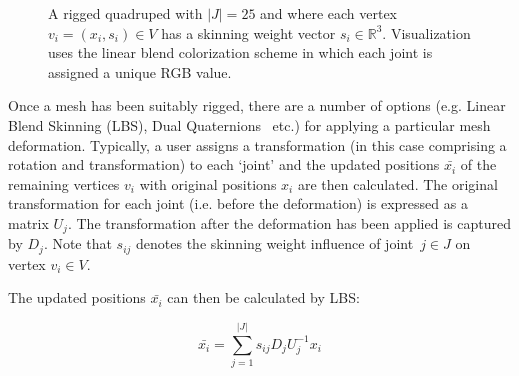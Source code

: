         \begin{figure}[H] %
            \caption{A rigged quadruped with $|J| = 25$ and where each vertex $v_{i} = (x_{i}, s_{i}) \in V$ has a skinning weight vector $s_{i} \in \mathbb{R}^{3}$. Visualization uses the linear blend colorization scheme in which each joint is assigned a unique RGB value.}
            \label{fig:rigged_quadruped}
        \end{figure}

        Once a mesh has been suitably rigged, there are a number of options (e.g. Linear Blend Skinning (LBS), Dual Quaternions~\cite{kavan2007skinning} etc.) for applying a particular mesh deformation. Typically, a user assigns a transformation (in this case comprising a rotation and transformation) to each `joint' and the updated positions $\bar{x_{i}}$ of the remaining vertices $v_{i}$ with original positions $x_{i}$ are then calculated. The original transformation for each joint (i.e. before the deformation) is expressed as a matrix $U_{j}$. The transformation after the deformation has been applied is captured by $D_{j}$. Note that $s_{ij}$ denotes the skinning weight influence of joint~$j \in J$ on vertex $v_{i} \in V$.
        
        The updated positions $\bar{x_{i}}$ can then be calculated by LBS:

        \begin{equation}
            \bar{x_{i}} = \sum_{j=1}^{|J|}s_{ij}D_{j}U_{j}^{-1}x_{i}
        \end{equation}

        \clearpage
